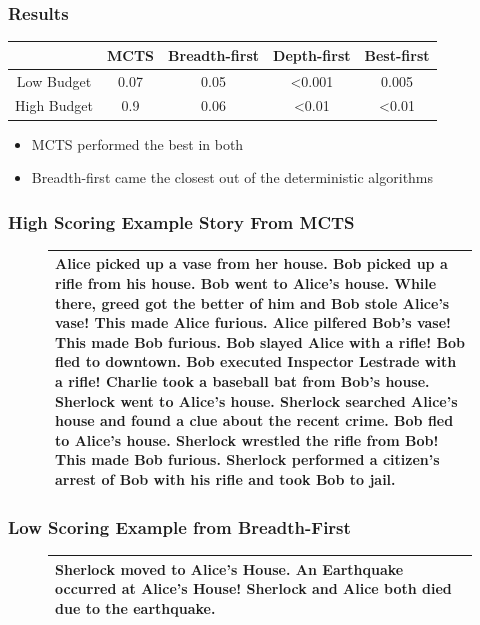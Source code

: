 \documentclass{beamer}
\begin{document}
\begin{frame}[fragile]
\frametitle{Results}
\begin{table}[h]
\centering
	\begin{tabular}{ c | c | c | c | c |}
	\cline{2-5}	 
	 & MCTS & Breadth-first & Depth-first & Best-first \\ \hline
	\multicolumn{1}{|p{1.5cm}|}{Low Budget} & 0.07 & 0.05 & <0.001 & 0.005 \\ \hline
	\multicolumn{1}{|p{1.5cm}|}{High Budget} & 0.9 & 0.06 & <0.01 & <0.01 \\ \hline
	\end{tabular}
\end{table}
\begin{itemize}
	\item MCTS performed the best in both
	\item Breadth-first came the closest out of the deterministic algorithms
\end{itemize}
\end{frame}

\begin{frame}[fragile]
\frametitle{High Scoring Example Story From MCTS}
\begin{figure}[h]
\begin{tabular}{|p{10cm}|}
\hline
Alice picked up a vase from her house. Bob picked up a rifle from his house. Bob went to Alice's house. While there, greed got the better of him and Bob stole Alice's vase! This made Alice furious. Alice pilfered Bob's vase! This made Bob furious. Bob slayed Alice with a rifle! Bob fled to downtown. Bob executed Inspector Lestrade with a rifle! Charlie took a baseball bat from Bob's house. Sherlock went to Alice's house. Sherlock searched Alice's house and found a clue about the recent crime. Bob fled to Alice's house. Sherlock wrestled the rifle from Bob! This made Bob furious. Sherlock performed a citizen's arrest of Bob with his rifle and took Bob to jail. \\ \hline
\end{tabular}
\centering
\label{fig:GoodStory}
\end{figure}
\end{frame}

\begin{frame}[fragile]
\frametitle{Low Scoring Example from Breadth-First}
\begin{figure}[h]
\begin{tabular}{|p{10cm}|}
\hline
Sherlock moved to Alice's House. An Earthquake occurred at Alice's House! Sherlock and Alice both died due to the earthquake. \\ \hline
\end{tabular}
\centering
\label{fig:BadStory}
\end{figure}
\end{frame}
\end{document}
